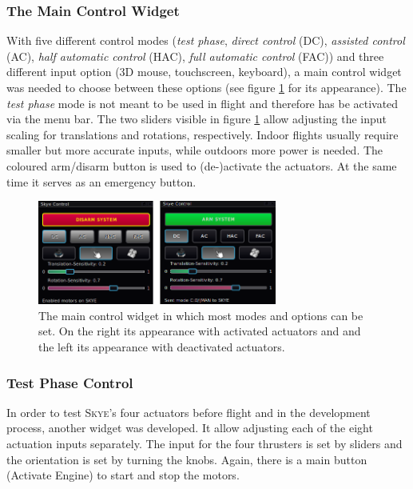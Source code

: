 \subsubsection{The Main Control Widget}
With five different control modes (\textit{test phase}, \textit{direct control} (DC), \textit{assisted control} (AC), \textit{half automatic control} (HAC), \textit{full automatic control} (FAC)) and three different input option (3D mouse, touchscreen, keyboard), a main control widget was needed to choose between these options (see figure \ref{fig:qgc_skye_control} for its appearance). 
The \textit{test phase} mode is not meant to be used in flight and therefore has be activated via the menu bar.
The two sliders visible in figure \ref{fig:qgc_skye_control} allow adjusting the input scaling for translations and rotations, respectively. Indoor flights usually require smaller but more accurate inputs, while outdoors more power is needed. The coloured arm/disarm button is used to (de-)activate the actuators. At the same time it serves as an emergency button.

\begin{figure}[H] %
	\begin{center}
		\includegraphics[width=0.7\textwidth]{qgc_skye_control}
		\caption{The main control widget in which most modes and options can be set. On the right its appearance with activated actuators and and the left its appearance with deactivated actuators.}
		\label{fig:qgc_skye_control}		
	\end{center}
\end{figure}



\subsubsection{Test Phase Control}
In order to test \textsc{Skye}'s four actuators before flight and in the development process, another widget was developed. It allow adjusting each of the eight actuation inputs separately. The input for the four thrusters is set by sliders and the orientation is set by turning the knobs. Again, there is a main button (Activate Engine) to start and stop the motors.

